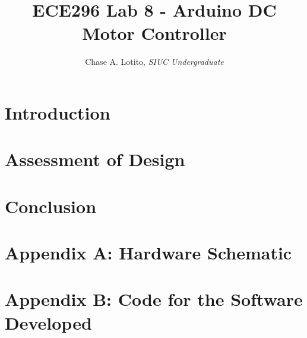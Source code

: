 \documentclass{IEEEtran}
\title{ECE296 Lab 8 - Arduino DC Motor Controller}
\author{Chase A. Lotito, \textit{SIUC Undergraduate}}
\date{}
\begin{document}
\maketitle %

\section{Introduction} 

\section{Assessment of Design}

\section{Conclusion}

\section*{Appendix A: Hardware Schematic}

\section*{Appendix B: Code for the Software Developed}
\end{document}
